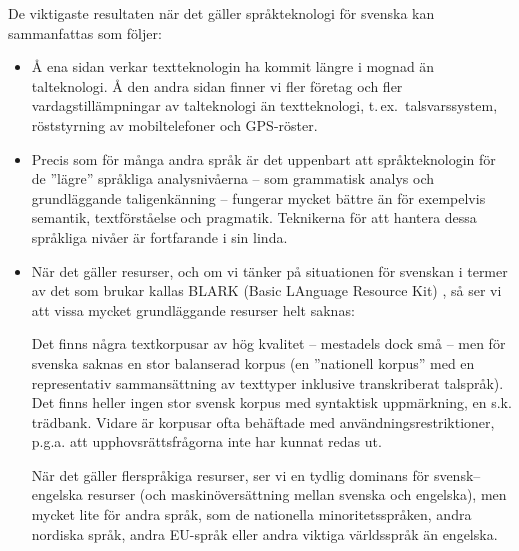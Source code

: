 \begin{multicols}{2}
De viktigaste resultaten när det gäller språkteknologi för svenska kan
sammanfattas som följer: \\ 

\begin{itemize}
\item Å ena sidan verkar textteknologin ha kommit längre i mognad än
  talteknologi. Å den andra sidan finner vi fler företag och fler
  vardagstillämpningar av talteknologi än textteknologi,
  t.\,ex.~talsvarssystem, röststyrning av mobiltelefoner och GPS-röster.
\item Precis som för många andra språk är det uppen\-bart att
  språkteknologin för de ''lägre'' språkliga analysnivåerna -- som
  grammatisk analys och grundläggande taligenkänning -- fungerar
  mycket bättre än för exempelvis semantik, textförståelse och
  pragmatik. Teknikerna för att hantera dessa språkliga nivåer är
  fortfarande i sin linda.
\item När det gäller resurser, och om vi tänker på situationen för
  svenskan i termer av det som brukar kallas BLARK (Basic LAnguage
  Resource Kit) \cite{blark}, så ser vi att vissa mycket grundläggande
  resurser helt saknas:

Det finns några textkorpusar av hög kvalitet -- mestadels dock små --
men för svenska saknas en stor balanserad korpus (en ''nationell
korpus'' med en representativ sammansättning av texttyper inklusive
transkriberat talspråk). Det finns heller ingen stor svensk korpus med
syntaktisk uppmärkning, en s.k. trädbank. Vidare är korpusar ofta
behäftade med användningsrestriktioner, p.g.a. att
upphovsrättsfrågorna inte har kunnat redas ut.

När det gäller flerspråkiga resurser, ser vi en tydlig dominans för
svensk--engelska resurser (och maskinöversättning mellan svenska och
engelska), men mycket lite för andra språk, som de nationella
minoritetsspråken, andra nordiska språk, andra EU-språk eller andra
viktiga världsspråk än engelska.


\end{itemize}
\end{multicols}
